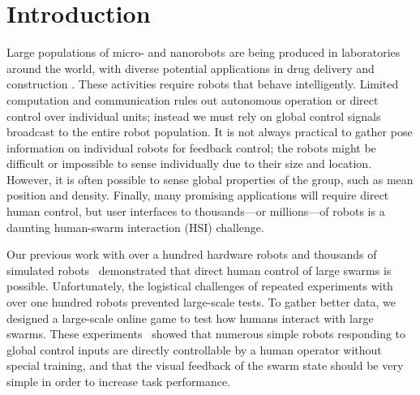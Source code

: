 \section{Introduction}\label{sec:Intro}


Large populations of micro- and nanorobots are being produced in laboratories around the world, with diverse potential applications in drug delivery and construction \cite{Peyer2013,Shirai2005,Chiang2011}. These activities require robots that behave intelligently.
Limited computation and communication rules out autonomous operation or direct control over individual units; instead we must rely on global control signals broadcast to the entire robot population.  It is not always practical to gather pose information on individual robots for feedback control; the robots might be difficult or impossible to sense individually due to their size and location. However, it is often possible to sense global properties of the group, such as mean position and density.  Finally, many promising applications will require direct human control, but user interfaces to thousands---or millions---of robots is a daunting human-swarm interaction (HSI) challenge. 

Our previous work with over a hundred hardware robots and thousands of simulated robots~\cite{Becker2013b} demonstrated that direct human control of large swarms is possible. Unfortunately, the logistical challenges of repeated experiments with over one hundred robots prevented large-scale tests. To gather better data, we designed a large-scale online game to test how humans interact with large swarms.  These  experiments~\cite{Becker2014e} showed that numerous simple robots responding to global control inputs are directly controllable by a human operator without special training, and that the visual feedback of the swarm state should be very simple in order to increase task performance.


